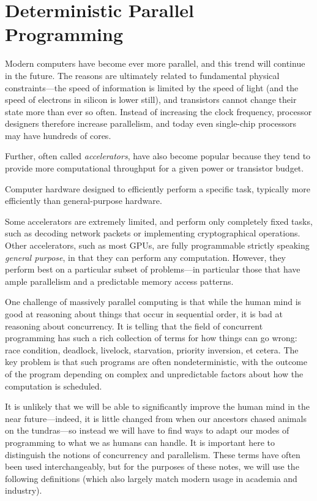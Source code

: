 \chapter{Deterministic Parallel Programming}

Modern computers have become ever more parallel, and this trend will
continue in the future. The reasons are ultimately related to
fundamental physical constraints---the speed of information is limited
by the speed of light (and the speed of electrons in silicon is lower
still), and transistors cannot change their state more than ever so
often. Instead of increasing the clock frequency, processor designers
therefore increase parallelism, and today even single-chip processors
may have hundreds of cores.

Further, often called \emph{accelerators}, have also become popular
because they tend to provide more computational throughput for a given
power or transistor budget.

\begin{definition}[Accelerator]
  Computer hardware designed to efficiently perform a specific task,
  typically more efficiently than general-purpose hardware.
\end{definition}

Some accelerators are extremely limited, and perform only completely
fixed tasks, such as decoding network packets or implementing
cryptographical operations. Other accelerators, such as most GPUs, are
fully programmable strictly speaking \emph{general purpose}, in that
they can perform any computation. However, they perform best on a
particular subset of problems---in particular those that have ample
parallelism and a predictable memory access patterns.

One challenge of massively parallel computing is that while the human
mind is good at reasoning about things that occur in sequential order,
it is bad at reasoning about concurrency. It is telling that the field
of concurrent programming has such a rich collection of terms for how
things can go wrong: race condition, deadlock, livelock, starvation,
priority inversion, et cetera. The key problem is that such programs
are often nondeterministic, with the outcome of the program depending
on complex and unpredictable factors about how the computation is
scheduled.

It is unlikely that we will be able to significantly improve the human
mind in the near future---indeed, it is little changed from when our
ancestors chased animals on the tundras---so instead we will have to
find ways to adapt our modes of programming to what we as humans can
handle. It is important here to distinguish the notions of concurrency
and parallelism. These terms have often been used interchangeably, but
for the purposes of these notes, we will use the following definitions
(which also largely match modern usage in academia and industry).

